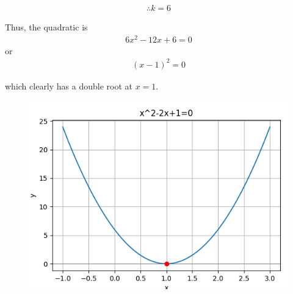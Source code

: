 \documentclass[journal]{IEEEtran}
\begin{document}
\begin{align}
\therefore k = 6
\end{align}

Thus, the quadratic is
\begin{align}
6x^2 - 12x + 6 = 0
\end{align}
or
\begin{align}
(x - 1)^2 = 0
\end{align}

which clearly has a double root at $x=1$.
\begin{figure}[ht!]
\centering
\includegraphics[height=0.4\textheight, keepaspectratio]{figs/parabola.png}
\end{figure}
\end{document}
